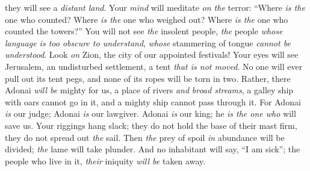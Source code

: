 \begin{biblechapter}
they will see a \textit{distant land}.
\verse Your \textit{mind} will meditate \textit{on the} terror: 
“Where \textit{is the} one who counted? 
Where \textit{is the} one who weighed out? 
Where \textit{is the} one who counted the towers?”
\verse You will not see \textit{the} insolent people, 
\textit{the} people \textit{whose language is too obscure to understand}, 
\textit{whose} stammering of tongue \textit{cannot be understood}.
\verse Look \textit{on} Zion, the city of our appointed festivals! 
Your eyes will see Jerusalem, 
an undisturbed settlement, 
a tent \textit{that is not moved}. 
No one will ever pull out its tent pegs, 
and none of its ropes will be torn in two.
\verse Rather, there Adonai \textit{will be} mighty for us, 
a place of rivers \textit{and} \textit{broad streams}, 
a galley ship with oars cannot go in it, 
and a mighty ship cannot pass through it.
\verse For Adonai \textit{is} our judge; Adonai \textit{is} our lawgiver. 
Adonai \textit{is} our king; he \textit{is the one who} will save us.
\verse Your riggings hang slack; 
they do not hold the base of their mast firm, 
they do not spread out \textit{the} sail. 
Then \textit{the} prey of spoil \textit{in} abundance will be divided; 
\textit{the} lame will take plunder.
\verse And no inhabitant will say, “I am sick”; 
the people who live in it, \textit{their} iniquity \textit{will be} taken away.
\end{biblechapter}

